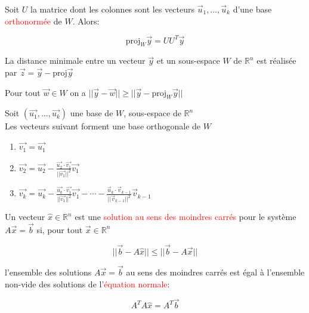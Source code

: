     \begin{theoreme}
        Soit $U$ la matrice dont les colonnes sont les vecteurs $\vec{u}_1, \dots, \vec{u}_k$ d'une base \textcolor{red}{orthonormée} de $W$. Alors:

        \begin{formule}
            \[\text{proj}_W\vec{y} = UU^T\vec{y}\]
        \end{formule}
    \end{theoreme}
    La distance minimale entre un vecteur $\vec{y}$ et un sous-espace $W$ de $\mathbb{R}^n$ est réalisée par $\vec{z} = \vec{y} - \text{proj}\vec{y}$
    \begin{theoreme}
        Pour tout $\vec{w} \in W$ on a $||\vec{y} - \vec{w}|| \geq ||\vec{y} - \text{proj}_W\vec{y}||$
    \end{theoreme}
    \begin{theoreme}
        Soit $(\vec{u_1}, \dots, \vec{u_k})$ une base de $W$, sous-espace de $\mathbb{R}^n$\\
        Les vecteurs suivant forment une base orthogonale de $W$
        \begin{enumerate}
            \item $\vec{v_1} = \vec{u_1}$
            \item $\vec{v_2} = \vec{u_2} - \frac{\vec{u_2}\cdot \vec{v_1}}{||\vec{v_1}||^2}\vec{v_1}$
            \item $\vec{v_k} = \vec{u_k} - \frac{\vec{u_k}\cdot\vec{v_1}}{||\vec{v_1}||^2}\vec{v_1} - \cdots - \frac{\vec{u}_k\cdot\vec{v}_{k-1}}{||\vec{v}_{k-1}||^2}\vec{v}_{k-1}$
        \end{enumerate}
    \end{theoreme}
    \begin{definition}
        Un vecteur $\hat{x} \in \mathbb{R}^n$ est une \textcolor{red}{solution au sens des moindres carrés} pour le système $A\vec{x} = \vec{b}$ si, pour tout $\vec{x} \in \mathbb{R}^n$
        \begin{formule}
            \[||\vec{b}-A\hat{x}|| \leq ||\vec{b} - A\vec{x}||\]
        \end{formule}
        
    \end{definition}
\begin{theoreme}
l'ensemble des solutions $A\vec{x} = \vec{b}$ au sens des moindres carrés est égal à l'ensemble non-vide des solutions de l'\textcolor{red}{équation normale}:
\begin{formule}
    \[A^TA\hat{x} = A^T\vec{b}\]
\end{formule}
\end{theoreme}
